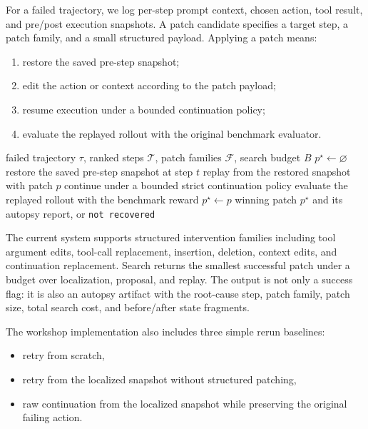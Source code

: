 \documentclass{article}
\begin{document}
For a failed trajectory, we log per-step prompt context, chosen action, tool
result, and pre/post execution snapshots. A patch candidate specifies a target
step, a patch family, and a small structured payload. Applying a patch means:
\begin{enumerate}
  \item restore the saved pre-step snapshot;
  \item edit the action or context according to the patch payload;
  \item resume execution under a bounded continuation policy;
  \item evaluate the replayed rollout with the original benchmark evaluator.
\end{enumerate}

\begin{algorithm}[t]
\caption{Minimal Patch Recovery via Checkpointed Replay}
\label{alg:minimal_patch_recovery}
\begin{algorithmic}[1]
\Require failed trajectory $\tau$, ranked steps $\mathcal{T}$, patch families $\mathcal{F}$, search budget $B$
\State $p^\star \gets \varnothing$
  \State restore the saved pre-step snapshot at step $t$
      \State replay from the restored snapshot with patch $p$
      \State continue under a bounded strict continuation policy
      \State evaluate the replayed rollout with the benchmark reward
          \State $p^\star \gets p$
        \EndIf
      \EndIf
    \EndFor
  \EndFor
\EndFor
\State \Return winning patch $p^\star$ and its autopsy report, or \texttt{not recovered}
\end{algorithmic}
\end{algorithm}

The current system supports structured intervention families including tool
argument edits, tool-call replacement, insertion, deletion, context edits, and
continuation replacement. Search returns the smallest successful patch under a
budget over localization, proposal, and replay. The output is not only a
success flag: it is also an autopsy artifact with the root-cause step, patch
family, patch size, total search cost, and before/after state fragments.

The workshop implementation also includes three simple rerun baselines:
\begin{itemize}
  \item retry from scratch,
  \item retry from the localized snapshot without structured patching,
  \item raw continuation from the localized snapshot while preserving the
  original failing action.
\end{itemize}
\end{document}

